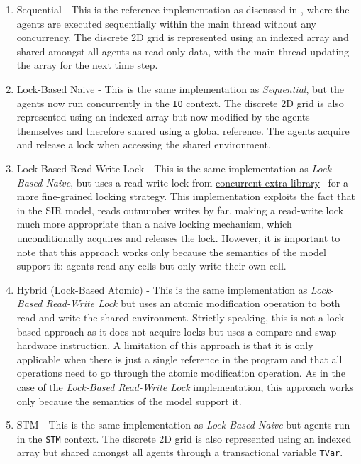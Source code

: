 \begin{enumerate}
	\item Sequential - This is the reference implementation as discussed in \cite{thaler_pure_2018}, where the agents are executed sequentially within the main thread without any concurrency. The discrete 2D grid is represented using an indexed array \cite{array_hackage} and shared amongst all agents as read-only data, with the main thread updating the array for the next time step.
		
	\item Lock-Based Naive - This is the same implementation as \textit{Sequential}, but the agents now run concurrently in the \texttt{IO} context.  The discrete 2D grid is also represented using an indexed array but now modified by the agents themselves and therefore shared using a global reference. The agents acquire and release a lock when accessing the shared environment.

	\item Lock-Based Read-Write Lock - This is the same implementation as \textit{Lock-Based Naive}, but uses a read-write lock from \href{http://hackage.haskell.org/package/concurrent-extra}{concurrent-extra library}~\cite{concurrent_extra_library} for a more fine-grained locking strategy. This implementation exploits the fact that in the SIR model, reads outnumber writes by far, making a read-write lock much more appropriate than a naive locking mechanism, which unconditionally acquires and releases the lock. However, it is important to note that this approach works only because the semantics of the model support it: agents read any cells but only write their own cell. 
	
	\item Hybrid (Lock-Based Atomic) - This is the same implementation as \textit{Lock-Based Read-Write Lock} but uses an atomic modification operation to both read and write the shared environment. Strictly speaking, this is not a lock-based approach as it does not acquire locks but uses a compare-and-swap hardware instruction. A limitation of this approach is that it is only applicable when there is just a single reference in the program and that all operations need to go through the atomic modification operation. As in the case of the \textit{Lock-Based Read-Write Lock} implementation, this approach works only because the semantics of the model support it. 
	
	\item STM - This is the same implementation as \textit{Lock-Based Naive} but agents run in the \texttt{STM} context. The discrete 2D grid is also represented using an indexed array but shared amongst all agents through a transactional variable \texttt{TVar}.
	
\end{enumerate}

